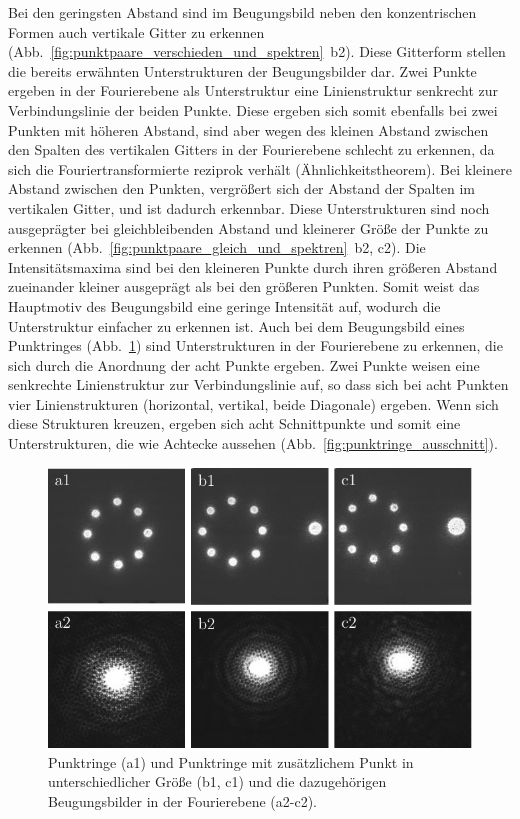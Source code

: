 Bei den geringsten Abstand sind im Beugungsbild neben den konzentrischen Formen auch vertikale Gitter zu erkennen (Abb.~\ref{fig:punktpaare_verschieden_und_spektren}~b2). Diese Gitterform stellen die bereits erwähnten Unterstrukturen der Beugungsbilder dar. Zwei Punkte ergeben in der Fourierebene als
Unterstruktur eine Linienstruktur senkrecht zur Verbindungslinie der beiden Punkte. Diese ergeben sich somit ebenfalls bei zwei Punkten mit höheren Abstand, sind aber wegen des kleinen Abstand zwischen den Spalten des vertikalen Gitters in der Fourierebene schlecht zu erkennen, da sich die Fouriertransformierte reziprok verhält (Ähnlichkeitstheorem). Bei kleinere Abstand zwischen den Punkten, vergrößert sich der Abstand der Spalten im vertikalen Gitter, und ist dadurch erkennbar. Diese Unterstrukturen sind noch ausgeprägter bei gleichbleibenden Abstand und kleinerer Größe der Punkte zu erkennen (Abb.~\ref{fig:punktpaare_gleich_und_spektren}~b2, c2). Die Intensitätsmaxima sind bei den kleineren Punkte durch ihren größeren Abstand zueinander kleiner ausgeprägt als bei den größeren Punkten. Somit weist das Hauptmotiv des Beugungsbild eine geringe Intensität auf, wodurch die Unterstruktur einfacher zu erkennen
ist.
Auch bei dem Beugungsbild eines Punktringes (Abb.~\ref{fig:punktringe_und_spektrum}) sind Unterstrukturen in der Fourierebene zu erkennen, die sich durch die Anordnung der acht Punkte ergeben. Zwei Punkte weisen eine senkrechte Linienstruktur zur Verbindungslinie auf, so dass sich bei acht Punkten vier Linienstrukturen (horizontal, vertikal, beide Diagonale) ergeben. Wenn sich diese Strukturen kreuzen, ergeben sich acht Schnittpunkte und somit eine Unterstrukturen, die wie Achtecke aussehen (Abb.~\ref{fig:punktringe_ausschnitt}).

\begin{figure}[h]
	\centering
	\includegraphics{images/Regina/abb17.pdf}
	\caption[Punktringe mit Fourierspektren]{
		Punktringe (a1) und Punktringe mit zusätzlichem Punkt in unterschiedlicher Größe (b1, c1) und die dazugehörigen Beugungsbilder in der Fourierebene (a2-c2).
	}
	\label{fig:punktringe_und_spektrum}
\end{figure}

